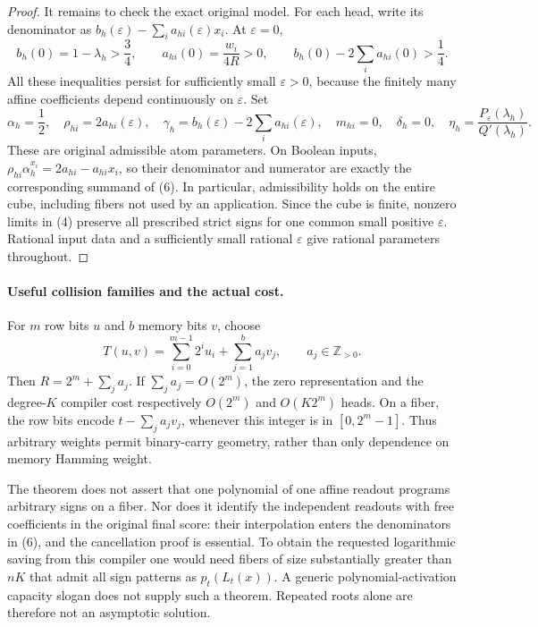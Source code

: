 \documentclass[11pt]{article}
\begin{document}
\begin{proof}
It remains to check the exact original model. For each head, write its
denominator as $b_h(\varepsilon)-\sum_i a_{hi}(\varepsilon)x_i$.
At $\varepsilon=0$,
\[
 b_h(0)=1-\lambda_h>\frac34,\qquad
 a_{hi}(0)=\frac{w_i}{4R}>0,\qquad
 b_h(0)-2\sum_i a_{hi}(0)>\frac14.
 \tag{11}
\]
All these inequalities persist for sufficiently small $\varepsilon>0$,
because the finitely many affine coefficients depend continuously on
$\varepsilon$. Set
\[
 \alpha_h=\frac12,\quad \rho_{hi}=2a_{hi}(\varepsilon),\quad
 \gamma_h=b_h(\varepsilon)-2\sum_i a_{hi}(\varepsilon),\quad
 m_{hi}=0,\quad \delta_h=0,\quad
 \eta_h=\frac{P_\varepsilon(\lambda_h)}{Q'(\lambda_h)}.
 \tag{12}
\]
These are original admissible atom parameters. On Boolean inputs,
$\rho_{hi}\alpha_h^{x_i}=2a_{hi}-a_{hi}x_i$, so their denominator
and numerator are exactly the corresponding summand of (6).
In particular, admissibility holds on the entire cube, including fibers
not used by an application. Since the cube is finite, nonzero limits in
(4) preserve all prescribed strict signs for one common small positive
$\varepsilon$. Rational input data and a sufficiently small rational
$\varepsilon$ give rational parameters throughout.
\end{proof}

\paragraph{Useful collision families and the actual cost.}
For $m$ row bits $u$ and $b$ memory bits $v$, choose
\[
 T(u,v)=\sum_{i=0}^{m-1}2^i u_i+\sum_{j=1}^b a_jv_j,
 \qquad a_j\in\mathbb Z_{>0}.
 \tag{13}
\]
Then $R=2^m+\sum_j a_j$. If $\sum_j a_j=O(2^m)$, the zero
representation and the degree-$K$ compiler cost respectively $O(2^m)$
and $O(K2^m)$ heads. On a fiber, the row bits encode
$t-\sum_j a_jv_j$, whenever this integer is in $[0,2^m-1]$.
Thus arbitrary weights permit binary-carry geometry, rather than only
dependence on memory Hamming weight.

The theorem does not assert that one polynomial of one affine readout
programs arbitrary signs on a fiber. Nor does it identify the independent
readouts with free coefficients in the original final score: their
interpolation enters the denominators in (6), and the cancellation proof
is essential. To obtain the requested logarithmic saving from this
compiler one would need fibers of size substantially greater than
$nK$ that admit all sign patterns as $p_t(L_t(x))$. A generic
polynomial-activation capacity slogan does not supply such a theorem.
Repeated roots alone are therefore not an asymptotic solution.
\end{document}
